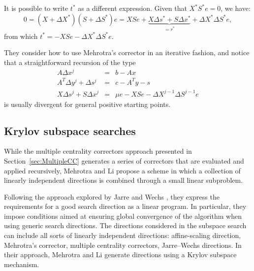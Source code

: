It is possible to write $t^*$ as a different expression. 
Given that $X^*S^*e=0$, we have:
\[
0 = (X+\Delta X^*)(S+\Delta S^*)e = XSe + 
    \underbrace{X\Delta s^* +S\Delta x^*}_{=r^*} +\Delta X^*\Delta S^*e,
\]
from which $t^* = -XSe - \Delta X^* \Delta S^*e$.

They consider how to use Mehrotra's corrector in an iterative 
fashion, and notice that a straightforward recursion of the type
\begin{eqnarray*}
  A\Delta x^j &=& b-Ax \\
  A^T\Delta y^j +\Delta s^j &=& c-A^Ty-s \\
  X\Delta s^j + S\Delta x^j &=& \mu e  -XSe -\Delta X^{j-1}\Delta S^{j-1}e
\end{eqnarray*}
is usually divergent for general positive starting points.


%
%
\subsection{Krylov subspace searches}

While the multiple centrality correctors approach 
presented in Section~\ref{sec:MultipleCC} 
generates a series of correctors 
that are evaluated and applied recursively, Mehrotra and Li 
\cite{MehrotraLi} propose a scheme in which a collection of linearly 
independent directions is combined through a small linear subproblem.

Following the approach explored by Jarre and Wechs \cite{JarreWechs}, 
they express the requirements for a good search direction as a linear 
program. In particular, they impose conditions aimed at ensuring 
global convergence of the algorithm when using generic search directions.
The directions considered in the subspace search can include all 
sorts of linearly independent directions: affine-scaling direction, 
Mehrotra's corrector, multiple centrality correctors, Jarre--Wechs 
directions. 
In their approach, Mehrotra and Li \cite{MehrotraLi}
generate directions using a Krylov subspace mechanism.


